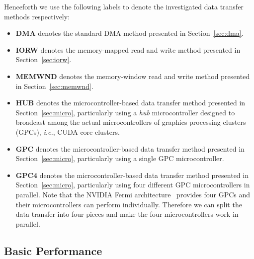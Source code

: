 Henceforth we use the following labels to denote the investigated data
transfer methods respectively:
\begin{itemize}
 \item \textbf{DMA} denotes the standard DMA method presented in
       Section~\ref{sec:dma}.
 \item \textbf{IORW} denotes the memory-mapped read and write method
       presented in Section~\ref{sec:iorw}.
 \item \textbf{MEMWND} denotes the memory-window read and write method
       presented in Section~\ref{sec:memwnd}.
 \item \textbf{HUB} denotes the microcontroller-based data transfer
       method presented in Section~\ref{sec:micro}, particularly using a
       \textit{hub} microcontroller designed to broadcast among the
       actual microcontrollers of graphics processing clusters (GPCs),
       \textit{i.e.}, CUDA core clusters.
 \item \textbf{GPC} denotes the microcontroller-based data transfer
       method presented in Section~\ref{sec:micro}, particularly using a
       single GPC microcontroller.
 \item \textbf{GPC4} denotes the microcontroller-based data transfer
       method presented in Section~\ref{sec:micro}, particularly using
       four different GPC microcontrollers in parallel.
       Note that the NVIDIA Fermi architecture~\cite{NVIDIA_Fermi}
       provides four GPCs and their microcontrollers can perform
       individually.
       Therefore we can split the data transfer into four pieces and
       make the four microcontrollers work in parallel.
\end{itemize}

\subsection{Basic Performance}
\label{sec:basic_performance}

